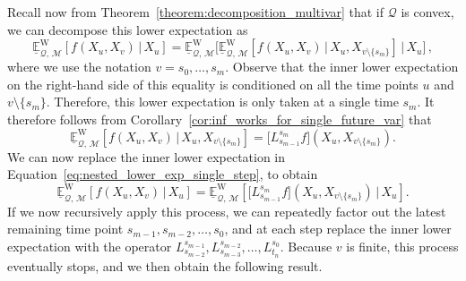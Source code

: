 \documentclass[10pt,a4paper]{paper}
\theoremstyle{definition}
\newtheorem{exmp}{Example}%
\newcommand{\states}{\mathcal{X}}
\newcommand{\processes}{\mathbb{P}}
\newcommand{\wprocesses}{\processes^{\mathrm{W}}}
\newcommand{\wmprocesses}{\processes^{\mathrm{WM}}}
\newcommand{\gambles}{\mathcal{L}}
\newcommand{\rateset}{\mathcal{Q}}
\newcommand{\exampleend}{\hfill$\Diamond$}
\begin{document}
Recall now from Theorem~\ref{theorem:decomposition_multivar} that if $\rateset$ is convex, we can decompose this lower expectation as
\begin{equation}\label{eq:nested_lower_exp_single_step}
\underline{\mathbb{E}}_{\rateset,\,\mathcal{M}}^{\mathrm{W}}[f(X_u,X_v)\,\vert\,X_u] = \underline{\mathbb{E}}_{\rateset,\,\mathcal{M}}^{\mathrm{W}}\bigl[ \underline{\mathbb{E}}_{\rateset,\,\mathcal{M}}^{\mathrm{W}}[f(X_u,X_v)\,\vert\,X_u,X_{v\setminus\{s_m\}}] \,\big\vert\,X_u\bigr]\,,
\end{equation}
where we use the notation $v=s_0,\ldots,s_m$. Observe that the inner lower expectation on the right-hand side of this equality is conditioned on all the time points $u$ and $v\setminus\{s_m\}$. Therefore, this lower expectation is only taken at a single time $s_m$. It therefore follows from Corollary~\ref{cor:inf_works_for_single_future_var} that
\begin{equation*}
\underline{\mathbb{E}}_{\rateset,\,\mathcal{M}}^{\mathrm{W}}[f(X_u,X_v)\,\vert\,X_u,X_{v\setminus\{s_m\}}]=\big[L_{s_{m-1}}^{s_m}f\big]\left(X_u,X_{v\setminus\{s_m\}}\right) .
\end{equation*}
We can now replace the inner lower expectation in Equation~\eqref{eq:nested_lower_exp_single_step}, to obtain
\begin{equation*}
\underline{\mathbb{E}}_{\rateset,\,\mathcal{M}}^{\mathrm{W}}[f(X_u,X_v)\,\vert\,X_u] = \underline{\mathbb{E}}_{\rateset,\,\mathcal{M}}^{\mathrm{W}}\left[ \big[L_{s_{m-1}}^{s_m}f\big]\left(X_u,X_{v\setminus\{s_m\}}\right) \,\big\vert\,X_u\right].
\end{equation*}
If we now recursively apply this process, we can repeatedly factor out the latest remaining time point $s_{m-1}, s_{m-2},\ldots,s_{0}$, and at each step replace the inner lower expectation with the operator $L_{s_{m-2}}^{s_{m-1}},L_{s_{m-3}}^{s_{m-2}},\ldots,L_{t_n}^{s_0}$. Because $v$ is finite, this process eventually stops, and we then obtain the following result.

%
\end{document}
